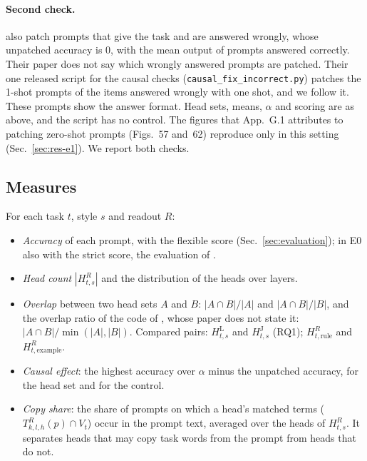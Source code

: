 \documentclass[11pt,a4paper]{article}
\begin{document}
\paragraph{Second check.} \citet[Sec.~2.4.1, App.~H.1.3, Figs.~7 and~67]{yang2026shared} also patch prompts that give the task and are answered wrongly, whose unpatched accuracy is 0, with the mean output of prompts answered correctly. Their paper does not say which wrongly answered prompts are patched. Their one released script for the causal checks (\texttt{causal\_fix\_incorrect.py}) patches the 1-shot prompts of the items answered wrongly with one shot, and we follow it. These prompts show the answer format. Head sets, means, $\alpha$ and scoring are as above, and the script has no control. The figures that App.~G.1 attributes to patching zero-shot prompts (Figs.~57 and~62) reproduce only in this setting (Sec.~\ref{sec:res-e1}). We report both checks.

\subsection{Measures}\label{sec:measures}
For each task $t$, style $s$ and readout $R$:
\begin{itemize}
\item \emph{Accuracy} of each prompt, with the flexible score (Sec.~\ref{sec:evaluation}); in E0 also with the strict score, the evaluation of \citet{yang2026shared}.
\item \emph{Head count} $|H^{R}_{t,s}|$ and the distribution of the heads over layers.
\item \emph{Overlap} between two head sets $A$ and $B$: $|A\cap B|/|A|$ and $|A\cap B|/|B|$, and the overlap ratio of the code of \citet{yang2026shared}, whose paper does not state it: $|A\cap B|/\min(|A|,|B|)$. Compared pairs: $H^{\mathrm{L}}_{t,s}$ and $H^{\mathrm{J}}_{t,s}$ (RQ1); $H^{R}_{t,\text{rule}}$ and $H^{R}_{t,\text{example}}$.
\item \emph{Causal effect}: the highest accuracy over $\alpha$ minus the unpatched accuracy, for the head set and for the control.
\item \emph{Copy share}: the share of prompts on which a head's matched terms ($T^{R}_{k,l,h}(p)\cap V_t$) occur in the prompt text, averaged over the heads of $H^{R}_{t,s}$. It separates heads that may copy task words from the prompt from heads that do not.
\end{itemize}
\end{document}
